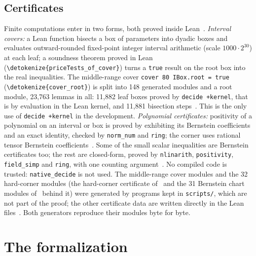 \documentclass[10pt]{article}
\theoremstyle{definition}
\theoremstyle{remark}
\numberwithin{equation}{section}
\newcommand{\lean}[1]{\texttt{#1}}
\newcommand{\leanid}[1]{\expandafter\nolinkurl\expandafter{\detokenize{#1}}}
\newcommand{\Fm}[1]{\cite[#1]{Formalization}}
\begin{document}
\subsection{Certificates}\label{sec:certs}
Finite computations enter in two forms, both proved inside Lean~\Fm{\S11.1}. \emph{Interval covers:} a Lean function bisects a box of parameters into dyadic boxes and evaluates outward-rounded fixed-point integer interval arithmetic (scale $1000\cdot2^{30}$) at each leaf; a soundness theorem proved in Lean (\leanid{priceTests_of_cover}) turns a \lean{true} result on the root box into the real inequalities. The middle-range cover \lean{cover 80 IBox.root = true} (\leanid{cover_root}) is split into 148 generated modules and a root module, 23,763 lemmas in all: 11,882 leaf boxes proved by \lean{decide +kernel}, that is by evaluation in the Lean kernel, and 11,881 bisection steps~\Fm{\S11.2}. This is the only use of \lean{decide +kernel} in the development. \emph{Polynomial certificates:} positivity of a polynomial on an interval or box is proved by exhibiting its Bernstein coefficients and an exact identity, checked by \lean{norm\_num} and \lean{ring}; the corner uses rational tensor Bernstein coefficients~\Fm{\S11.3}. Some of the small scalar inequalities are Bernstein certificates too; the rest are closed-form, proved by \lean{nlinarith}, \lean{positivity}, \lean{field\_simp} and \lean{ring}, with one counting argument~\Fm{\S11.4}. No compiled code is trusted: \lean{native\_decide} is not used. The middle-range cover modules and the 32 hard-corner modules (the hard-corner certificate of~\Fm{\S11.3} and the 31 Bernstein chart modules of~\Fm{\S10.6} behind it) were generated by programs kept in \lean{scripts/}, which are not part of the proof; the other certificate data are written directly in the Lean files~\Fm{\S11.5}. Both generators reproduce their modules byte for byte.

\section{The formalization}\label{sec:lean}
\end{document}
